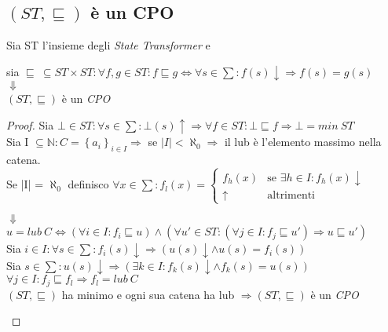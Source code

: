 \subsection{$(ST, \sqsubseteq)$ è un CPO}
\begin{esercizio}
  Sia ST l'insieme degli \emph{State Transformer} e
  \begin{center}
    sia $\sqsubseteq\ \subseteq ST \times ST :
    \forall f,g \in ST : f \sqsubseteq g \Longleftrightarrow \forall s \in \sum :
    f(s)\downarrow \Rightarrow f(s) = g(s)$\\
    $\Downarrow$\\
    $(ST, \sqsubseteq)$ è un \emph{CPO}
  \end{center}
  \begin{proof}
    Sia $\bot \in ST : \forall s \in \sum : \bot(s)\uparrow \Rightarrow \forall f \in ST : \bot \sqsubseteq f \Rightarrow \bot = min\ ST $\\
    Sia I $\subseteq \mathbb{N} : C = \left\{a_i\right\}_{i \in I} \Rightarrow$ se $|I| < \aleph_0 \Rightarrow$ il lub è l'elemento massimo nella catena.\\
    Se |I| = $\aleph_0$ definisco $\forall x \in \sum : f_l(x) =
    \begin{cases}
      f_h(x) & \text{se } \exists h \in I : f_h(x)\downarrow
      \\
      \uparrow & \text{altrimenti}
    \end{cases} $
    \begin{center}
      $\Downarrow$\\
      $u = lub\ C \Longleftrightarrow (\forall i \in I : f_i \sqsubseteq u) \land (\forall u' \in ST : (\forall j \in I : f_j \sqsubseteq u') \Rightarrow u \sqsubseteq u')$\\
      Sia $i \in I : \forall s \in \sum : f_i(s)\downarrow \Rightarrow (u(s)\downarrow \land u(s)=f_i(s))$\\
      Sia $s \in \sum : u(s)\downarrow \Rightarrow (\exists k \in I : f_k(s)\downarrow \land f_k(s)=u(s))$\\
      $\forall j \in I : f_j \sqsubseteq f_l \Rightarrow f_l = lub\ C$\\
      $(ST, \sqsubseteq)$ ha minimo e ogni sua catena ha lub $\Rightarrow (ST, \sqsubseteq)$ è un \emph{CPO}
    \end{center}
  \end{proof}
\end{esercizio}


